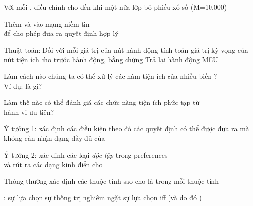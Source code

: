 \documentclass{article}
\begin{document}
\begin{huge}
Với mỗi , điều chỉnh  cho đến khi một nửa lớp bỏ phiếu xổ số (M=10.000)

\vspace*{0.2in}

\textwidth
{}




Thêm  và  vào mạng niềm tin\\
để cho phép đưa ra quyết định hợp lý

\vspace*{0.2in}

\textwidth
{}

\vspace*{-0.4in}

Thuật toán:\al
  Đối với mỗi giá trị của nút hành động \nl
    tính toán giá trị kỳ vọng của nút tiện ích cho trước hành động, bằng chứng\al
  Trả lại hành động MEU



Làm cách nào chúng ta có thể xử lý các hàm tiện ích của nhiều biến ?\\
Ví dụ:  là gì?

Làm thế nào có thể đánh giá các chức năng tiện ích phức tạp từ \\
hành vi ưu tiên?

Ý tưởng 1: xác định các điều kiện theo đó các quyết định có thể được đưa ra mà không cần
nhận dạng đầy đủ của 

Ý tưởng 2: xác định các loại \emph{độc lập} trong preferences\\
và rút ra các dạng kinh điển cho 


Thông thường xác định các thuộc tính sao cho  là  trong mỗi thuộc tính

: sự lựa chọn  sự thống trị nghiêm ngặt sự lựa chọn  iff\nl
{} \quad (và do đó )


\end{huge}
\end{document}
